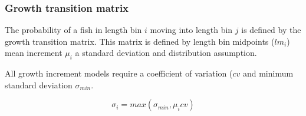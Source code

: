 %
%

\subsubsection{Growth transition matrix}\label{sec:GrowthIncrement-GrowthMatrix}

The probability of a fish in length bin \(i\) moving into length bin \(j\) is defined by the growth transition matrix. This matrix is defined by length bin midpoints (\(lm_i\)) mean increment \(\mu_i\) a standard deviation and distribution assumption.

All growth increment models require a coefficient of variation (\(cv\) and minimum standard deviation \(\sigma_{min}\). 

\[
\sigma_i = max(\sigma_{min}, \mu_i cv)
\]


